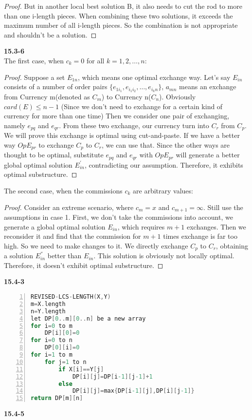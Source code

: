 \documentclass{article}
\begin{document}
{\begin{proof}
But in another local best solution B, it also needs to cut the rod to more than one i-length pieces.
When combining these two solutions, it exceeds the maximum number of all i-length pieces. So the combination
is not appropriate and shouldn't be a solution.
\end{proof}
\textbf{15.3-6}\\
The first case, when $c_k=0$ for all $k=1,2,\dots,n$:
\begin{proof}
Suppose a set $E_{1n}$, which means one optimal exchange way. 
Let's say $E_{in}$ consists of a number of order pairs 
$\{e_{1i_1},e_{i_1i_2},\dots,e_{i_{k}n}\}$, $a_{mn}$ means an
exchange from Currency m(denoted as $C_m$) to Currency n($C_n$). Obviously $card(E)\le n-1$
(Since we don't need to exchange for a certain kind of currency for more than one time)
Then we consider one pair of exchanging, namely $e_{pq}$ and $e_{qr}$. From these two exchange,
our currency turn into $C_r$ from $C_p$. We will prove this exchange is optimal using cut-and-paste.
If we have a better way $OpE_{pr}$ to exchange $C_p$ to $C_r$, we can use that. Since the other ways are thought 
to be optimal, substitute $e_{pq}$ and $e_{qr}$ with $OpE_{pr}$ will generate a better global optimal solution $E_{in}^{'}$, 
contradicting our assumption. Therefore, it exhibits optimal substructure.    
\end{proof}
The second case, when the commissions $c_k$ are arbitrary values:
\begin{proof}
Consider an extreme scenario, where $c_m=x$ and $c_{m+1}=\infty$. Still use the assumptions in case 1. First, we don't 
take the commissions into account, we generate a global optimal solution $E_{in}$, which requires $m+1$ exchanges. Then
we reconsider it and find that the commission for $m+1$ times exchange is far too high. So we need to make changes to it.
We directly exchange $C_p$ to $C_r$, obtaining a solution $E_{in}^{''}$ better than $E_{in}$. This solution is obviously not
locally optimal. Therefore, it doesn't exhibit optimal substructure.
\end{proof} 
\textbf{15.4-3}
\begin{lstlisting}[language=C,numbers=left]
REVISED-LCS-LENGTH(X,Y)
m=X.length
n=Y.length
let DP[0..m][0..n] be a new array
for i=0 to m
	DP[i][0]=0
for i=0 to n
	DP[0][i]=0
for i=1 to m
	for j=1 to n
	 	if X[i]==Y[j]
	 		DP[i][j]=DP[i-1][j-1]+1
		else
			DP[i][j]=max{DP[i-1][j],DP[i][j-1]}
return DP[m][n]
\end{lstlisting}
\textbf{15.4-5}
\begin{lstlisting}[language=C,numbers=left]

\end{lstlisting}}
\end{document}
